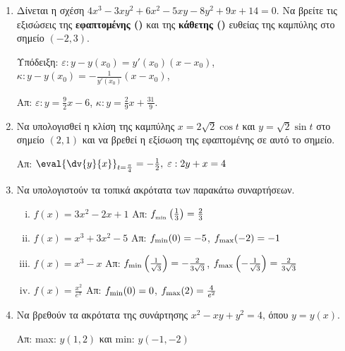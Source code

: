 \begin{enumerate}
  \item Δίνεται η σχέση $ 4x^{3} - 3xy^{2} + 6x^{2} - 5xy - 8 y^{2} + 9x + 14
    = 0$. Να βρείτε τις εξισώσεις της \textbf{εφαπτομένης (\varepsilon)} και της
    \textbf{κάθετης (\kappa)} 
    ευθείας της καμπύλης στο σημείο $ (-2,3) $.

    \textcolor{Col1}{Υπόδειξη:} 
    $ \varepsilon: y-y(x_{0}) = y'(x_{0})(x- x_{0}) $, \;
    $ \kappa: y-y(x_{0}) = -\frac{1}{y'(x_{0})}(x- x_{0}) $, \;

    \hfill Απ: $\varepsilon\colon y = \frac{9}{2} x - 6 $, 
    $\kappa\colon y = \frac{2}{9} x + \frac{31}{9} $.

  \item Να υπολογισθεί η κλίση της καμπύλης $ x= 2 \sqrt{2} \cos{t} $ και $ y=
    \sqrt{2} \sin{t} $ στο σημείο $ (2,1) $ και να βρεθεί η εξίσωση της εφαπτομένης 
    σε αυτό το σημείο.

    \hfill Απ: $ \eval{\dv{y}{x}} _{t= \frac{\pi}{4}} = - \frac{1}{2}, \; 
    \varepsilon: 2y+x=4 $  

  \item Να υπολογιστούν τα τοπικά ακρότατα των παρακάτω συναρτήσεων.

    \begin{enumerate}[i)]
      \renewcommand{\itemsep}{15pt}
      \item $ f(x) = 3x^{2}-2x+1 $ 
        \hfill Απ: $ f_{\rm_{min}}\left(\frac{1}{3} \right) = \frac{2}{3} $ 
      \item $ f(x) = x^{3}+3x^{2}-5 $ 
        \hfill Απ: $ f_{\rm min}(0) = -5 $, $ f_{\rm max}(-2) = -1 $ 
      \item $ f(x) = x^{3} - x $ 
        \hfill Απ: $ f_{\rm min}\left(\frac{1}{\sqrt{3}} \right) 
        = - \frac{2}{3 \sqrt{3}} $, $ f_{\rm max} \left(-\frac{1}{\sqrt{3}} 
        \right) = \frac{2}{3 \sqrt{3}} $
      \item $ f(x) = \frac{x^{2}}{e^{x}} $
        \hfill Απ: $ f_{\rm min}(0) = 0 $, $f_{\rm max}(2) = \frac{4}{e^{2}} $ 
    \end{enumerate}

  \item Να βρεθούν τα ακρότατα της συνάρτησης $ x^{2}-xy+y^{2}=4 $, όπου $ y=y(x) $.

    \hfill Απ: \textlatin{max}: $ y(1,2) $ και \textlatin{min}: $ y(-1,-2) $


\end{enumerate}
